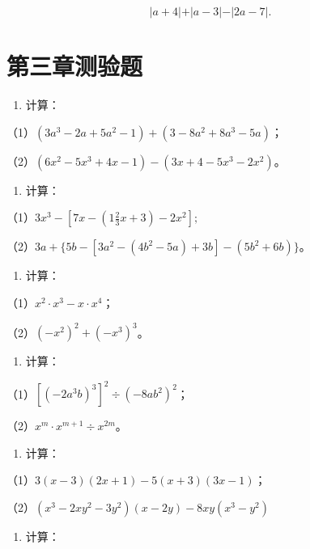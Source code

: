 \[
\vert a + 4 \vert + \vert a - 3 \vert - \vert 2 a - 7 \vert .
\]

\section{第三章测验题}

\begin{enumerate}
\item
  计算：
\end{enumerate}

（1）\((3a^{3} - 2a + 5a^{2} - 1) + (3 - 8a^{2} + 8a^{3} - 5a)\)；

（2）\((6x^{2} - 5x^{3} + 4x - 1) - (3x + 4 - 5x^{3} - 2x^{2})\)。

\begin{enumerate}[start=2]
\item
  计算：
\end{enumerate}

（1）\(3x^{3} - \left[7x - \left(1\frac{2}{3} x + 3\right) - 2x^{2}\right];\)

（2）\(3a + \{5b - [3a^2 - (4b^2 - 5a) + 3b] - (5b^2 + 6b)\}\)。

\begin{enumerate}[start=3]
\item
  计算：
\end{enumerate}

（1）\(x^{2} \cdot x^{3} - x \cdot x^{4}\)；

（2）\((-x^{2})^{2} + (-x^{3})^{3}\)。

\begin{enumerate}[start=4]
\item
  计算：
\end{enumerate}

（1）\(\left[(-2a^{3}b)^{3}\right]^{2} \div (-8ab^{2})^{2}\)；

（2）\(x^{m} \cdot x^{m+1} \div x^{2m}\)。

\begin{enumerate}[start=5]
\item
  计算：
\end{enumerate}

（1）\(3(x - 3)(2x + 1) - 5(x + 3)(3x - 1)\)；

（2）\((x^{3} - 2xy^{2} - 3y^{2})(x - 2y) - 8xy(x^{3} - y^{2})\)

\begin{enumerate}[start=6]
\item
  计算：
\end{enumerate}

